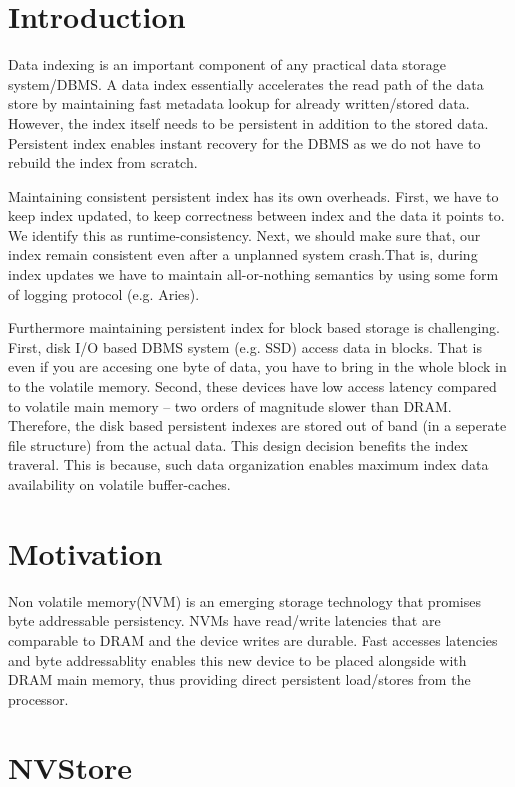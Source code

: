 \section{Introduction}
Data indexing is an important component of any practical data storage system/DBMS.
A data index essentially accelerates the read path of the data store by maintaining
fast metadata lookup for already written/stored data. However, the index itself 
needs to be persistent in addition to the stored data. Persistent index enables 
instant recovery for the DBMS as we do not have to rebuild the index from scratch.

Maintaining consistent persistent index has its own overheads. First, we have to keep 
index updated, to keep correctness between index and the data it points to. We identify
this as runtime-consistency. Next, we should make sure that, our index remain consistent
even after a unplanned system crash.That is, during index updates we have to maintain
all-or-nothing semantics by using some form of logging protocol (e.g. Aries).


Furthermore maintaining persistent index for block based storage is challenging.
First, disk I/O based DBMS system (e.g. SSD) access data in blocks. That is 
even if you are accesing one byte of data, you have to bring in the whole block in to the
volatile memory. Second, these devices have low access latency compared to volatile main memory --
two orders of magnitude slower than DRAM. Therefore, the disk based persistent indexes are
stored out of band (in a seperate file structure) from the actual data. This design
decision benefits the index traveral. This is because, such data organization enables
maximum index data availability on volatile buffer-caches.


\section{Motivation}
Non volatile memory(NVM) is an emerging storage technology that promises byte addressable 
persistency. NVMs have read/write latencies that are comparable to DRAM and the device 
writes are durable. Fast accesses latencies and byte addressablity enables this new device
to be placed alongside with DRAM main memory, thus providing direct persistent load/stores
from the processor.




\cite{pmwcas}



\section{NVStore}

